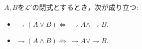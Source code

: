 	
	\begin{screen}
		\begin{metathm}[De Morganの法則]
			$A,B$を$\mathcal{L}'$の閉式とするとき，次が成り立つ:
			\begin{itemize}
				\item $\rightharpoondown (A \vee B) \Longleftrightarrow\ \rightharpoondown A \wedge \rightharpoondown B$.
			
				\item $\rightharpoondown (A \wedge B) \Longleftrightarrow\ \rightharpoondown A \vee \rightharpoondown B$.
			\end{itemize}
		\end{metathm}
	\end{screen}
	
